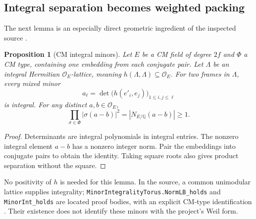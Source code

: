 \documentclass[11pt,letterpaper]{article}
\newtheorem{proposition}[theorem]{Proposition}
\theoremstyle{definition}
\theoremstyle{remark}
\newcommand{\Q}{\mathbb Q}
\numberwithin{equation}{section}
\begin{document}
\subsection{Integral separation becomes weighted packing}
The next lemma is an especially direct geometric ingredient of the inspected source \cite{packing}.

\begin{proposition}[CM integral minors]\label{prop:cm}
Let $E$ be a CM field of degree $2f$ and $\Phi$ a CM type, containing one embedding from each conjugate pair. Let $\Lambda$ be an integral Hermitian $\mathcal O_E$-lattice, meaning $h(\Lambda,\Lambda)\subseteq\mathcal O_E$. For two frames in $\Lambda$, every mixed minor
\[
 a_\ell=\det\bigl(h(e'_i,e_j)\bigr)_{1\le i,j\le\ell}
\]
is integral. For any distinct $a,b\in\mathcal O_E$,
\[
 \prod_{\sigma\in\Phi}|\sigma(a-b)|^2
 =|N_{E/\Q}(a-b)|\ge1.
\]
\end{proposition}
\begin{proof}
Determinants are integral polynomials in integral entries. The nonzero integral element $a-b$ has a nonzero integer norm. Pair the embeddings into conjugate pairs to obtain the identity. Taking square roots also gives product separation without the square.
\end{proof}

No positivity of $h$ is needed for this lemma. In the source, a common unimodular lattice supplies integrality; \texttt{MinorIntegralityTorus.NormLB\_holds} and \texttt{MinorInt\_holds} are located proof bodies, with an explicit CM-type identification \cite{minors}. Their existence does not identify these minors with the project's Weil form.
\end{document}
